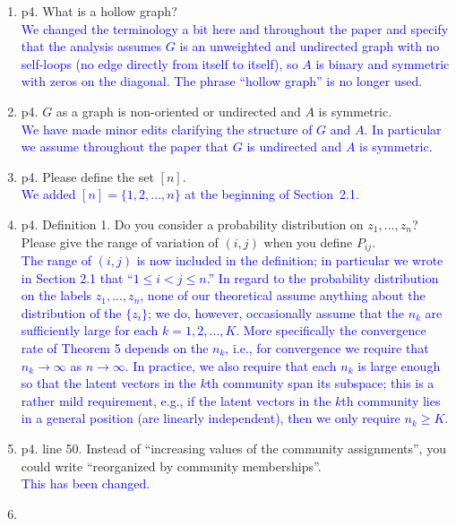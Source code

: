 \documentclass[
]{article}
\begin{document}
\begin{enumerate}
\def\labelenumi{\arabic{enumi}.}
\item
  p4. What is a hollow graph?\\
  \textcolor{blue}{
  We changed the terminology a bit here and throughout the paper and
  specify that the analysis assumes $G$ is an unweighted and undirected
  graph with no self-loops 
  (no edge directly from itself to itself), 
  so $A$ is binary and symmetric with zeros on the diagonal. The phrase
  ``hollow graph'' is no longer used.  }
\item
  p4. \(G\) as a graph is non-oriented or undirected and \(A\) is
  symmetric.\\
  \textcolor{blue}{
  We have made minor edits clarifying the structure of $G$ and $A$. In
  particular we assume throughout the paper that $G$ is undirected and $A$ is
  symmetric. 
  }
\item
  p4. Please define the set \([n]\).\\
  \textcolor{blue}{
  We added $[n] = \{1, 2, ..., n\}$ at the beginning of Section~2.1. 
  }
\item
  p4. Definition 1. Do you consider a probability distribution on
  \(z_1, ..., z_n\)? Please give the range of variation of \((i, j)\)
  when you define \(P_{ij}\).\\
  \textcolor{blue}{
  The range of $(i, j)$ is now included in the definition; in particular
  we wrote in Section 2.1 that ``$1 \leq i < j \leq n$.''
  In regard to the probability distribution on the labels $z_1, ...,
  z_n$, none of our theoretical assume anything about the distribution
  of the $\{z_i\}$; we do, however, occasionally assume that the $n_k$
  are sufficiently large for each $k = 1,2,\dots, K$. More specifically 
  the convergence rate of Theorem 5 depends on the $n_k$, i.e., for
  convergence we require that $n_k \to \infty$ as $n \rightarrow
  \infty$. In practice, we also require that each $n_k$ is large enough
  so that the latent vectors in the $k$th community span its
  subspace; this is a rather mild requirement, e.g., if the latent vectors in the $k$th community lies in a
  general position (are linearly independent), then we only require $n_k
  \geq K$.}
\item
  p4. line 50. Instead of ``increasing values of the community
  assignments'', you could write ``reorganized by community
  memberships''.\\
  \textcolor{blue}{
  This has been changed.
  }
\item

\end{enumerate}
\end{document}
